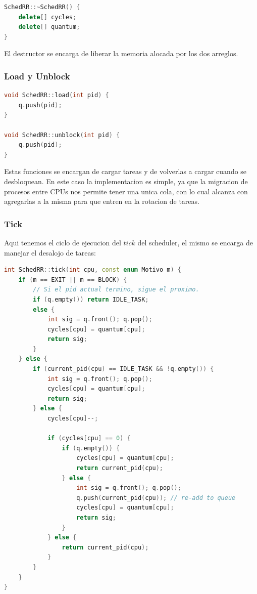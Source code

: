 \begin{lstlisting}[language=C++, breaklines=true]
SchedRR::~SchedRR() {
	delete[] cycles;
	delete[] quantum;
}
\end{lstlisting}

El destructor se encarga de liberar la memoria alocada por los dos arreglos.

\subsubsection{Load y Unblock}

\begin{lstlisting}[language=C++, breaklines=true]
void SchedRR::load(int pid) {
	q.push(pid);
}

void SchedRR::unblock(int pid) {
	q.push(pid);
}
\end{lstlisting}

Estas funciones se encargan de cargar tareas y de volverlas a cargar cuando se desbloquean. En este caso la implementacion es simple, ya que la migracion de procesos entre CPUs nos permite tener una unica cola, con lo cual alcanza con agregarlas a la misma para que entren en la rotacion de tareas.

\subsubsection{Tick}

Aqui tenemos el ciclo de ejecucion del $tick$ del scheduler, el mismo se encarga de manejar el desalojo de tareas:

\begin{lstlisting}[language=C++, breaklines=true]
int SchedRR::tick(int cpu, const enum Motivo m) {
	if (m == EXIT || m == BLOCK) {
		// Si el pid actual termino, sigue el proximo.
		if (q.empty()) return IDLE_TASK;
		else {
			int sig = q.front(); q.pop();
			cycles[cpu] = quantum[cpu];
			return sig;
		}
	} else {
		if (current_pid(cpu) == IDLE_TASK && !q.empty()) {
			int sig = q.front(); q.pop();
			cycles[cpu] = quantum[cpu];
			return sig;
		} else {
			cycles[cpu]--;

			if (cycles[cpu] == 0) {
				if (q.empty()) {
					cycles[cpu] = quantum[cpu];
					return current_pid(cpu);
				} else {
					int sig = q.front(); q.pop();
					q.push(current_pid(cpu)); // re-add to queue
					cycles[cpu] = quantum[cpu];
					return sig;
				}
			} else {
				return current_pid(cpu);
			}
		}
	}
}
\end{lstlisting}

